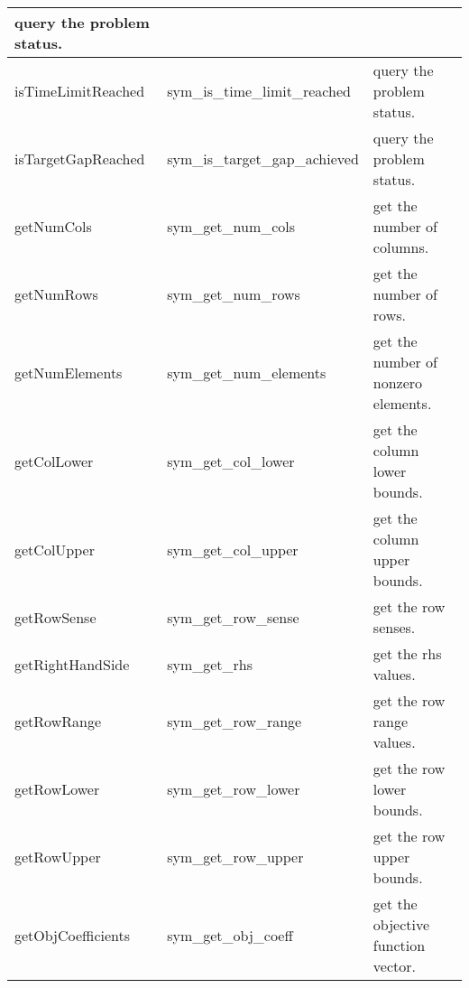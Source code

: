 \documentclass[twoside,11pt]{book}
\def\lthtmlcheckvsize{\ifdim\ht\sizebox<\vsize 
  \ifdim\wd\sizebox<\hsize\expandafter\hfill\fi \expandafter\vfill
  \else\expandafter\vss\fi}%
\begin{document}
{{\begin{tabular}{|l||l||l|}
query the problem status. \\\hline \hline
isTimeLimitReached & sym\_is\_time\_limit\_reached &
query the problem status. \\\hline \hline
isTargetGapReached & sym\_is\_target\_gap\_achieved &
query the problem status. \\\hline \hline
getNumCols & sym\_get\_num\_cols &
get the number of columns. \\\hline \hline
getNumRows & sym\_get\_num\_rows &
get the number of rows. \\\hline \hline
getNumElements & sym\_get\_num\_elements &
get the number of nonzero elements. \\\hline \hline
getColLower & sym\_get\_col\_lower &
get the column lower bounds. \\\hline \hline
getColUpper & sym\_get\_col\_upper &
get the column upper bounds. \\\hline \hline
getRowSense & sym\_get\_row\_sense &
get the row senses. \\\hline \hline
getRightHandSide & sym\_get\_rhs &
get the rhs values. \\\hline \hline
getRowRange & sym\_get\_row\_range &
get the row range values. \\\hline \hline
getRowLower & sym\_get\_row\_lower &
get the row lower bounds. \\\hline \hline
getRowUpper & sym\_get\_row\_upper &
get the row upper bounds. \\\hline \hline
getObjCoefficients & sym\_get\_obj\_coeff &
get the objective function vector. \\\hline
\end{tabular}
}%
\lthtmlpictureZ
\lthtmlcheckvsize\clearpage}
\end{document}
